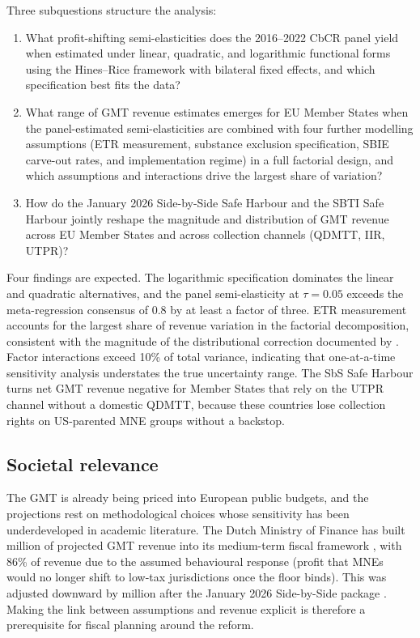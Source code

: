 \documentclass[11pt,a4paper]{article}
\newcommand{\EUR}{\texteuro}
\begin{document}
Three subquestions structure the analysis:

\begin{enumerate}
\item What profit-shifting semi-elasticities does the 2016--2022 CbCR panel yield when estimated under linear, quadratic, and logarithmic functional forms using the Hines--Rice framework with bilateral fixed effects, and which specification best fits the data?
\item What range of GMT revenue estimates emerges for EU Member States when the panel-estimated semi-elasticities are combined with four further modelling assumptions (ETR measurement, substance exclusion specification, SBIE carve-out rates, and implementation regime) in a full factorial design, and which assumptions and interactions drive the largest share of variation?
\item How do the January 2026 Side-by-Side Safe Harbour and the SBTI Safe Harbour jointly reshape the magnitude and distribution of GMT revenue across EU Member States and across collection channels (QDMTT, IIR, UTPR)?
\end{enumerate}

Four findings are expected. The logarithmic specification dominates the linear and quadratic alternatives, and the panel semi-elasticity at $\tau = 0.05$ exceeds the meta-regression consensus of 0.8 \citep{heckemeyer2017} by at least a factor of three. ETR measurement accounts for the largest share of revenue variation in the factorial decomposition, consistent with the magnitude of the distributional correction documented by \citet{hugger2026}. Factor interactions exceed 10\% of total variance, indicating that one-at-a-time sensitivity analysis understates the true uncertainty range. The SbS Safe Harbour turns net GMT revenue negative for Member States that rely on the UTPR channel without a domestic QDMTT, because these countries lose collection rights on US-parented MNE groups without a backstop.

\subsection{Societal relevance}\label{sec:relevance}

The GMT is already being priced into European public budgets, and the projections rest on methodological choices whose sensitivity has been underdeveloped in academic literature. The Dutch Ministry of Finance has built \EUR466 million of projected GMT revenue into its medium-term fiscal framework \citep{36369_3}, with 86\% of revenue due to the assumed behavioural response (profit that MNEs would no longer shift to low-tax jurisdictions once the floor binds). This was adjusted downward by \EUR122 million after the January 2026 Side-by-Side package \citep{1028}. Making the link between assumptions and revenue explicit is therefore a prerequisite for fiscal planning around the reform.
\end{document}
